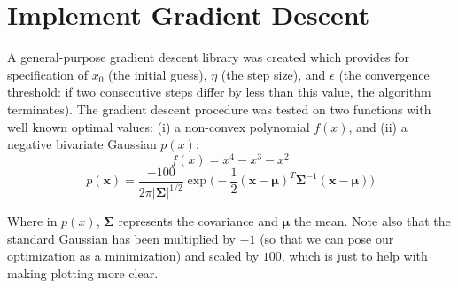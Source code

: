 \documentclass{article}
\begin{document}
 



\section{Implement Gradient Descent}
A general-purpose gradient descent library was created which provides for specification of $x_0$ (the initial guess), $\eta$ (the step size), and $\epsilon$ (the convergence threshold: if two consecutive steps differ by less than this value, the algorithm terminates).  The gradient descent procedure was tested on two functions with well known optimal values: (i)  a non-convex polynomial $f(x)$, and (ii) a negative bivariate Gaussian $p(x)$:
$$f(x) = x^4 - x^3 -x^2$$
$$p(\mathbf{x}) = \frac{-100}{2\pi|\mathbf{\Sigma}|^{1/2}}\exp{\bigg(-\frac{1}{2} (\mathbf{x} - \mathbf{\mu})^T\mathbf{\Sigma}^{-1} (\mathbf{x} - \mathbf{\mu}) \bigg)}$$

Where in $p(x)$, $\mathbf{\Sigma}$ represents the covariance and $\mathbf{\mu}$ the mean.  Note also that the standard Gaussian has been multiplied by $-1$ (so that we can pose our optimization as a minimization) and scaled by $100$, which is just to help with making plotting more clear.
\end{document}
